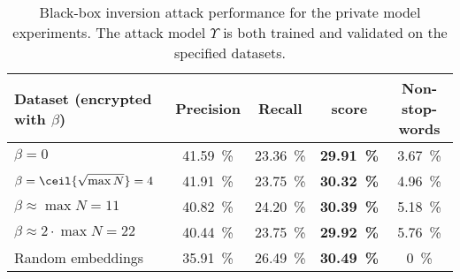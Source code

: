 \begin{table}[!ht]
	\renewcommand{\arraystretch}{1.2}
	\begin{tabular*}{\linewidth}{ !{\extracolsep\fill} l c c >{\bfseries}c c } %
		\toprule
			Dataset (encrypted with $\beta$)	& Precision				& Recall				& \FOne{} score 		& Non-stop-words		\\
		\midrule
			$\beta = 0$							& \SI{41.59}{\percent}	& \SI{23.36}{\percent}	& \SI{29.91}{\percent}	& \SI{3.67}{\percent}	\\
			$\beta = \ceil{\sqrt{\max N}} = 4$	& \SI{41.91}{\percent}	& \SI{23.75}{\percent}	& \SI{30.32}{\percent}	& \SI{4.96}{\percent}	\\
			$\beta \approx \max N = 11$			& \SI{40.82}{\percent} 	& \SI{24.20}{\percent} 	& \SI{30.39}{\percent}	& \SI{5.18}{\percent}	\\
			$\beta \approx 2 \cdot \max N = 22$	& \SI{40.44}{\percent} 	& \SI{23.75}{\percent} 	& \SI{29.92}{\percent}	& \SI{5.76}{\percent}	\\
		\midrule
			Random embeddings					& \SI{35.91}{\percent}	& \SI{26.49}{\percent}	& \SI{30.49}{\percent}	& \SI{0}{\percent}		\\
		\bottomrule
	\end{tabular*}
	\caption[Inversion attack performance for the private model experiments]{
		Black-box inversion attack performance for the private model experiments.
		The attack model $\Upsilon$ is both trained and validated on the specified datasets.
	}%
	\label{table:knn-private}
\end{table}
